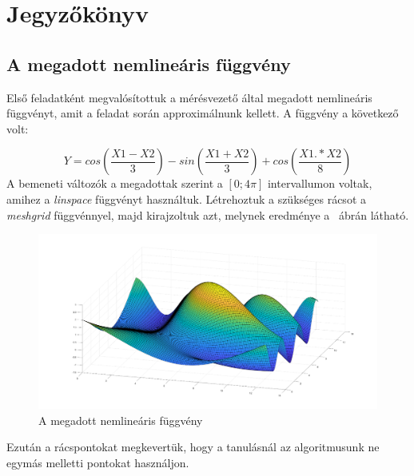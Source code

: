 \chapter{Jegyzőkönyv}


\section{A megadott nemlineáris függvény}


Első feladatként megvalósítottuk a mérésvezető által megadott nemlineáris függvényt, amit a feladat során approximálnunk kellett. A függvény a következő volt: 

\begin{equation}\label{key}
Y = cos(\frac{X1-X2}{3}) - sin(\frac{X1+X2}{3}) + cos(\frac{X1.*X2}{8})
\end{equation}
A bemeneti változók a megadottak szerint a $ [0; 4\pi] $ intervallumon voltak, amihez a \textit{linspace} függvényt használtuk. Létrehoztuk a szükséges rácsot a \textit{meshgrid} függvénnyel, majd kirajzoltuk azt, melynek eredménye a ~ábrán látható. 

\begin{figure}[!h]
	\centering
	\includegraphics[width=150mm, keepaspectratio]{figures/m04/fig1.png}
	\caption{A megadott nemlineáris függvény} 
	\label{fig:fgv}
\end{figure}

Ezután a rácspontokat megkevertük, hogy a tanulásnál az algoritmusunk ne egymás melletti pontokat használjon. 
\newpage
\label{Matlab1}

